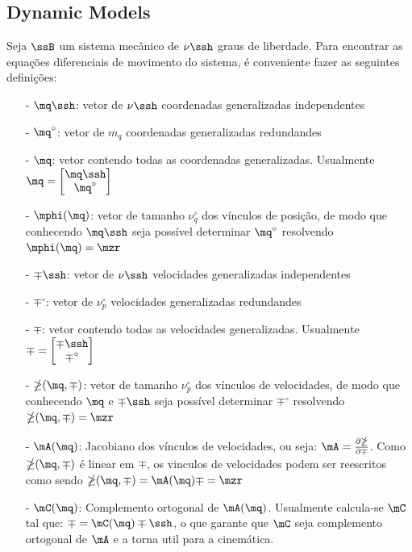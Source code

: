 \subsection{Dynamic Models}\label{S02-2}


Seja $\ssB$ um sistema mecânico de $\nu\ssh$ graus de liberdade. Para encontrar as equações diferenciais de movimento do sistema, é conveniente fazer as seguintes definições:

\begin{itemize}
\item[-]$\mq\ssh$: vetor de $\nu\ssh$ coordenadas generalizadas independentes
\item[-]$\mq^\circ$: vetor de $m_q$ coordenadas generalizadas redundandes
\item[-]$\mq$: vetor contendo todas as coordenadas generalizadas. Usualmente $\mq = \begin{bmatrix} \mq\ssh \\\mq^\circ \end{bmatrix} $
\item[-]$\mphi(\mq)$: vetor de tamanho $\nu_q^\circ$ dos vínculos de posição, de modo que conhecendo $\mq\ssh$ seja possível determinar $\mq^\circ$ resolvendo $\mphi(\mq) = \mzr$
\item[-]$\mp\ssh$: vetor de $\nu\ssh$ velocidades generalizadas independentes
\item[-]$\mp^\circ$: vetor de $\nu_p^\circ$ velocidades generalizadas redundandes
\item[-]$\mp$: vetor contendo todas as velocidades generalizadas. Usualmente $\mp = \begin{bmatrix} \mp\ssh \\\mp^\circ \end{bmatrix} $
\item[-]$\mathbb{\Lambda(\mq,\mp)}$: vetor de tamanho $\nu_p^\circ$ dos vínculos de velocidades, de modo que conhecendo $\mq$ e $\mp\ssh$ seja possível determinar $\mp^\circ$ resolvendo $\mathbb{\Lambda} (\mq,\mp) = \mzr$
\item[-]$\mA(\mq)$: Jacobiano dos vínculos de velocidades, ou seja: $\mA = \frac{\partial \mathbb{\Lambda}}{\partial \mp}$. Como $\mathbb{\Lambda} (\mq,\mp)$ \'e linear em $\mp$, os vinculos de velocidades podem ser reescritos como sendo $\mathbb{\Lambda} (\mq,\mp) = \mA(\mq) \mp = \mzr$
\item[-]$\mC(\mq)$: Complemento ortogonal de $\mA(\mq)$. Usualmente calcula-se $\mC$ tal que: $ \mp = \mC (\mq) \mp\ssh $, o que garante que $\mC$ seja complemento ortogonal de $\mA$ e a torna util para a cinemática.

\end{itemize}
